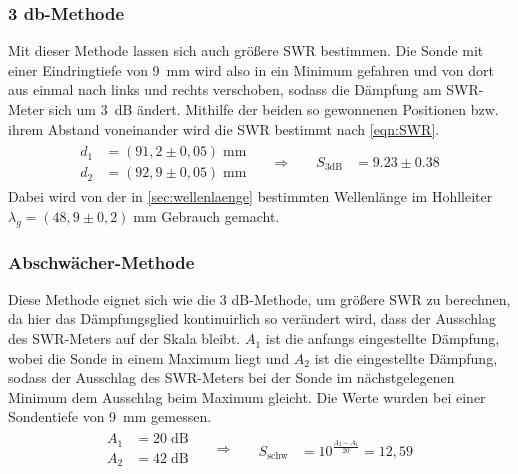     \subsubsection*{3 db-Methode}
        Mit dieser Methode lassen sich auch größere SWR bestimmen.
        Die Sonde mit einer Eindringtiefe von \SI{9}{mm} wird also in ein Minimum gefahren und von dort aus einmal nach links und rechts verschoben, sodass die Dämpfung am SWR-Meter sich um \SI{3}{dB} ändert.
        Mithilfe der beiden so gewonnenen Positionen bzw. ihrem Abstand voneinander wird die SWR bestimmt nach \autoref{eqn:SWR}.
        \begin{align*}
            \begin{aligned}
                d_1 &= (91,2 \pm 0,05)\;\mathrm{mm} \\
                d_2 &= (92,9 \pm 0,05)\;\mathrm{mm}
            \end{aligned}
            && \Rightarrow && 
            \begin{aligned}
                S_{\mathrm{3dB}} &= 9.23 \pm 0.38
            \end{aligned}
        \end{align*}
        Dabei wird von der in \autoref{sec:wellenlaenge} bestimmten Wellenlänge im Hohlleiter $\lambda_g = (48,9 \pm 0,2)\; \mathrm{mm}$ Gebrauch gemacht.

    \subsubsection*{Abschwächer-Methode}
        Diese Methode eignet sich wie die 3 dB-Methode, um größere SWR zu berechnen, da hier das Dämpfungsglied kontinuirlich so verändert wird, dass der Ausschlag des SWR-Meters auf der Skala bleibt.
        $A_1$ ist die anfangs eingestellte Dämpfung, wobei die Sonde in einem Maximum liegt und $A_2$ ist die eingestellte Dämpfung, sodass der Ausschlag des SWR-Meters bei der Sonde im nächstgelegenen Minimum dem Ausschlag beim Maximum gleicht.
        Die Werte wurden bei einer Sondentiefe von \SI{9}{mm} gemessen.
        \begin{align*}
            \begin{aligned}
                A_1 &= 20 \; \mathrm{dB} \\
                A_2 &= 42 \; \mathrm{dB}
            \end{aligned}
            && \Rightarrow && 
            \begin{aligned}
                S_{\mathrm{schw}} &= 10^{\frac{A_2 - A_1}{20}} = 12,59
            \end{aligned}
        \end{align*}
    




